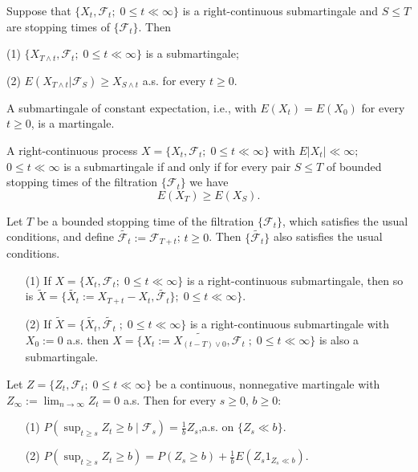 \documentclass{report}
\begin{document}
\begin{prob}
	Suppose that \( \{X_t,\mathscr{F}_t;\; 0\le t\ll \infty \} \) is a right-continuous
	submartingale and \( S\le T \) are stopping times of \( \{\mathscr{F}_t\} \). Then
	\item[(1)] \( \{X_{T\wedge t},\mathscr{F}_t;\; 0\le t\ll \infty \} \) is a submartingale;
	\item[(2)] \( E(X_{T\wedge t}|\mathscr{F}_S)\ge X_{S\wedge t} \) a.s. for every \( t\ge0. \)
\end{prob}

\begin{prob}
	A submartingale of constant expectation, i.e., with \( E(X_t)=E(X_0) \) for every \( t\ge 0 \),
	is a martingale.
\end{prob}

\begin{prob}
	A right-continuous process \( X=\{X_t,\mathscr{F}_t;\; 0\le t\ll \infty \} \) with \( E|X_t|\ll \infty; \) \( 0\le t\ll \infty \) is a submartingale if and only if for every pair \( S\le T \) of
	bounded stopping times of the filtration \( \{\mathscr{F}_t\} \) we have
	\[E(X_T)\ge E(X_S).\]
\end{prob}

\begin{prob}
	Let \( T \) be a bounded stopping time of the filtration \( \{\mathscr{F}_t\} \), which
	satisfies the usual conditions, and define \( \tilde{\mathscr{F}_t}:=\mathscr{F}_{T+t} \);\; \( t\ge0 \). Then \( \{\tilde{\mathscr{F}_t}\} \) also satisfies the usual conditions.
	\begin{itemize}
		\item[(1)] If \( X=\{X_t,\mathscr{F}_t;\; 0\le t\ll \infty \} \) is a right-continuous submartingale, then so is \( \tilde{X}=\{\tilde{X_t}:=X_{T+t}-X_t,\tilde{\mathscr{F}_t}\};\; 0\le t\ll \infty \} \).
		\item[(2)] If  \( \tilde{X}=\{\tilde{X_t},\tilde{\mathscr{F}_t} \;;\; 0\le t \ll \infty \} \) is a right-continuous submartingale with \( X_0:=0 \) a.s. then
		      \( X=\{X_t:=\tilde{X_{(t-T)\vee 0}},\mathscr{F}_t\;;\; 0\le t\ll \infty \} \) is also a submartingale.
	\end{itemize}
\end{prob}

\begin{prob}
	Let \( Z=\{Z_t,\mathscr{F}_t;\; 0\le t\ll \infty \} \) be a continuous, nonnegative martingale
	with \( Z_{\infty }:=\lim_{n\to \infty }Z_t=0 \) a.s. Then for every \( s\ge0 \), \( b\ge0 \):
	\begin{itemize}
		\item[(1)] \( P(\sup_{t\ge s}Z_t\ge b\;|\;\mathscr{F}_s)=\frac{1}{b}Z_s \),\quad a.s. on \( \{Z_s\ll b\}. \)
		\item[(2)] \( P(\sup_{t\ge s}Z_t\ge b)=P(Z_s\ge b)+\frac{1}{b}E(Z_s1_{Z_s\ll b}). \)
	\end{itemize}
\end{prob}
\end{document}
